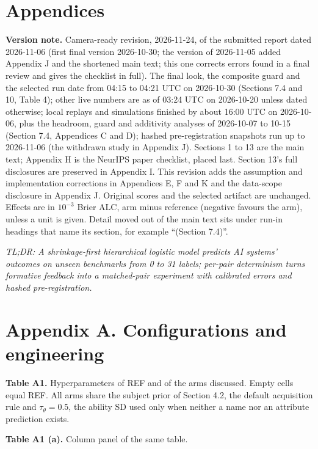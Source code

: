 \documentclass[
]{article}
\begin{document}
\section{Appendices}\label{appendices}

\textbf{Version note.} Camera-ready revision, 2026-11-24, of the
submitted report dated 2026-11-06 (first final version 2026-10-30; the
version of 2026-11-05 added Appendix J and the shortened main text; this
one corrects errors found in a final review and gives the checklist in
full). The final look, the composite guard and the selected run date
from 04:15 to 04:21 UTC on 2026-10-30 (Sections 7.4 and 10, Table 4);
other live numbers are as of 03:24 UTC on 2026-10-20 unless dated
otherwise; local replays and simulations finished by about 16:00 UTC on
2026-10-06, plus the headroom, guard and additivity analyses of
2026-10-07 to 10-15 (Section 7.4, Appendices C and D); hashed
pre-registration snapshots run up to 2026-11-06 (the withdrawn study in
Appendix J). Sections 1 to 13 are the main text; Appendix H is the
NeurIPS paper checklist, placed last. Section 13's full disclosures are
preserved in Appendix I. This revision adds the assumption and
implementation corrections in Appendices E, F and K and the data-scope
disclosure in Appendix J. Original scores and the selected artifact are
unchanged. Effects are in \(10^{-3}\) Brier ALC, arm minus reference
(negative favours the arm), unless a unit is given. Detail moved out of
the main text sits under run-in headings that name its section, for
example ``(Section 7.4)''.

\emph{TL;DR: A shrinkage-first hierarchical logistic model predicts AI
systems' outcomes on unseen benchmarks from 0 to 31 labels; per-pair
determinism turns formative feedback into a matched-pair experiment with
calibrated errors and hashed pre-registration.}

\section{Appendix A. Configurations and
engineering}\label{appendix-a.-configurations-and-engineering}

\textbf{Table A1.} Hyperparameters of REF and of the arms discussed.
Empty cells equal REF. All arms share the subject prior of Section 4.2,
the default acquisition rule and \(\tau_\theta = 0.5\), the ability SD
used only when neither a name nor an attribute prediction exists.

\textbf{Table A1 (a).} Column panel of the same table.
\end{document}
